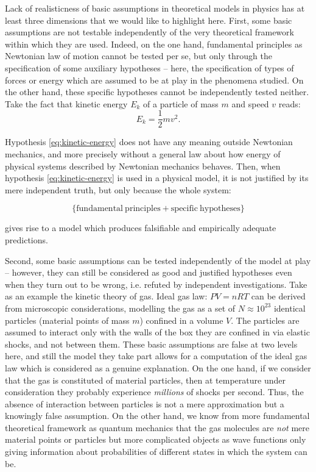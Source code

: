 \documentclass[a4paper,11pt]{article}
\theoremstyle{definition}
\begin{document}
Lack of realisticness of basic assumptions in theoretical models in physics has at least three dimensions that we would like to highlight here. First, some basic assumptions are not testable independently of the very theoretical framework within which they are used. Indeed, on the one hand, fundamental principles as Newtonian law of motion cannot be tested per se, but only through the specification of some auxiliary hypotheses -- here, the specification of types of forces or energy which are assumed to be at play in the phenomena studied. On the other hand, these specific hypotheses cannot be independently tested neither. Take the fact that kinetic energy $E_k$ of a particle of mass $m$ and speed $v$ reads: 
\begin{equation}
E_k=\frac{1}{2}mv^2.
\label{eq:kinetic-energy}
\end{equation}

Hypothesis \eqref{eq:kinetic-energy} does not have any meaning outside Newtonian mechanics, and more precisely without a general law about how energy of physical systems described by Newtonian mechanics behaves. Then, when hypothesis \eqref{eq:kinetic-energy} is used in a physical model, it is not justified by its mere independent truth, but only because the whole system:

\begin{equation}
\{\mathrm{fundamental~principles + specific~hypotheses}\}
\label{eq:pattern_expl}
\end{equation}

gives rise to a model which produces falsifiable and empirically adequate predictions.

Second, some basic assumptions can be tested independently of the model at play -- however, they can still be considered as good and justified hypotheses even when they turn out to be wrong, i.e. refuted by independent investigations. Take as an example the kinetic theory of gas. Ideal gas law: $PV=nRT$ can be derived from microscopic considerations, modelling the gas as a set of $N\approx 10^{23}$ identical particles (material points of mass $m$) confined in a volume $V$. The particles are assumed to interact only with the walls of the box they are confined in via elastic shocks, and not between them. These basic assumptions are false at two levels here, and still the model they take part allows for a computation of the ideal gas law which is considered as a genuine explanation. On the one hand, if we consider that the gas is constituted of material particles, then at temperature under consideration they probably experience \textit{millions} of shocks per second. Thus, the absence of interaction between particles is not a mere approximation but a knowingly false assumption. On the other hand, we know from more fundamental theoretical framework as quantum mechanics that the gas molecules are \textit{not} mere material points or particles but more complicated objects as wave functions only giving information about probabilities of different states in which the system can be.
\end{document}
